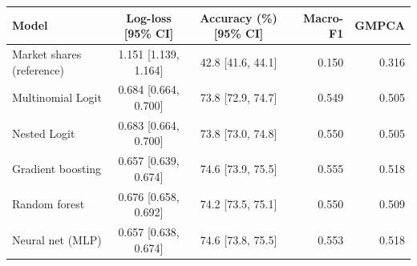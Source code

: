 \begin{tabular}{lccrr}
\toprule
Model & Log-loss [95\% CI] & Accuracy (\%) [95\% CI] & Macro-F1 & GMPCA \\
\midrule
Market shares (reference) & 1.151 [1.139, 1.164] & 42.8 [41.6, 44.1] & 0.150 & 0.316 \\
\midrule
Multinomial Logit & 0.684 [0.664, 0.700] & 73.8 [72.9, 74.7] & 0.549 & 0.505 \\
Nested Logit & 0.683 [0.664, 0.700] & 73.8 [73.0, 74.8] & 0.550 & 0.505 \\
Gradient boosting & 0.657 [0.639, 0.674] & 74.6 [73.9, 75.5] & 0.555 & 0.518 \\
Random forest & 0.676 [0.658, 0.692] & 74.2 [73.5, 75.1] & 0.550 & 0.509 \\
Neural net (MLP) & 0.657 [0.638, 0.674] & 74.6 [73.8, 75.5] & 0.553 & 0.518 \\
\bottomrule
\end{tabular}
